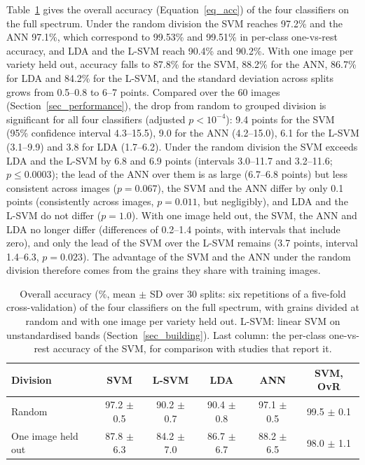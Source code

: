 \documentclass[final,5p,times,twocolumn]{elsarticle}
\newcommand{\added}[1]{{\color{blue}#1}}
\begin{document}
\added{Table~\ref{tab:acc} gives the overall accuracy (Equation~\ref{eq_acc}) of the four classifiers on the full spectrum. Under the random division the SVM reaches 97.2\% and the ANN 97.1\%, which correspond to 99.53\% and 99.51\% in per-class one-vs-rest accuracy, and LDA and the L-SVM reach 90.4\% and 90.2\%. With one image per variety held out, accuracy falls to 87.8\% for the SVM, 88.2\% for the ANN, 86.7\% for LDA and 84.2\% for the L-SVM, and the standard deviation across splits grows from 0.5--0.8 to 6--7 points. Compared over the 60 images (Section~\ref{sec_performance}), the drop from random to grouped division is significant for all four classifiers (adjusted $p<10^{-4}$): 9.4 points for the SVM (95\% confidence interval 4.3--15.5), 9.0 for the ANN (4.2--15.0), 6.1 for the L-SVM (3.1--9.9) and 3.8 for LDA (1.7--6.2). Under the random division the SVM exceeds LDA and the L-SVM by 6.8 and 6.9 points (intervals 3.0--11.7 and 3.2--11.6; $p\le0.0003$); the lead of the ANN over them is as large (6.7--6.8 points) but less consistent across images ($p=0.067$), the SVM and the ANN differ by only 0.1 points (consistently across images, $p=0.011$, but negligibly), and LDA and the L-SVM do not differ ($p=1.0$). With one image held out, the SVM, the ANN and LDA no longer differ (differences of 0.2--1.4 points, with intervals that include zero), and only the lead of the SVM over the L-SVM remains (3.7 points, interval 1.4--6.3, $p=0.023$). The advantage of the SVM and the ANN under the random division therefore comes from the grains they share with training images.}

\begin{table}[htbp!]
    \centering
    \caption{\added{Overall accuracy (\%, mean $\pm$ SD over 30 splits: six repetitions of a five-fold cross-validation) of the four classifiers on the full spectrum, with grains divided at random and with one image per variety held out. L-SVM: linear SVM on unstandardised bands (Section~\ref{sec_building}). Last column: the per-class one-vs-rest accuracy of the SVM, for comparison with studies that report it.}}
    \label{tab:acc}
    \begin{tabular}{lccccc}
    \hline
    Division & SVM & L-SVM & LDA & ANN & SVM, OvR \\
    \hline
    Random             & 97.2 $\pm$ 0.5 & 90.2 $\pm$ 0.7 & 90.4 $\pm$ 0.8 & 97.1 $\pm$ 0.5 & 99.5 $\pm$ 0.1 \\
    One image held out & 87.8 $\pm$ 6.3 & 84.2 $\pm$ 7.0 & 86.7 $\pm$ 6.7 & 88.2 $\pm$ 6.5 & 98.0 $\pm$ 1.1 \\
    \hline
    \end{tabular}
\end{table}
\end{document}
